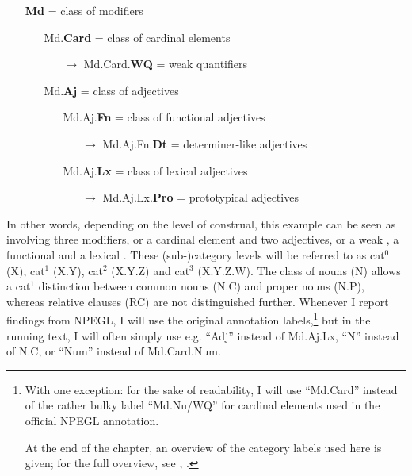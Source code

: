 \documentclass[output=paper,colorlinks,citecolor=brown,draft]{langscibook}
\begin{document}
\begin{enumerate}
    \item[] \textbf{Md} \hfill = class of modifiers
    \begin{enumerate}
        \item[] Md.\textbf{Card}  \hfill  = class of cardinal elements
        \begin{enumerate}
            \item[$\rightarrow$] Md.Card.\textbf{WQ}  \hfill = weak quantifiers
        \end{enumerate}
        \item[] Md.\textbf{Aj}   \hfill = class of adjectives 
        \begin{enumerate}
            \item[] Md.Aj.\textbf{Fn}  \hfill = class of functional adjectives
            \begin{enumerate}
                \item[$\rightarrow$] Md.Aj.Fn.\textbf{Dt}  \hfill = determiner-like adjectives
            \end{enumerate}
            \item[] Md.Aj.\textbf{Lx}  \hfill = class of lexical adjectives
            \begin{enumerate}
                \item[$\rightarrow$] Md.Aj.Lx.\textbf{Pro} \hfill = prototypical  adjectives
            \end{enumerate}
        \end{enumerate}
    \end{enumerate}
\end{enumerate}

In other words, depending on the level of construal, this example can be seen as involving three modifiers, or a cardinal element and two adjectives, or a weak , a functional  and a lexical . These (sub-)category levels will be referred to as cat$^0$ (X), cat$^1$ (X.Y), cat$^2$ (X.Y.Z) and cat$^3$ (X.Y.Z.W). 
The class of nouns (N) allows a cat$^1$ distinction between common nouns (N.C) and proper nouns (N.P), whereas relative clauses (RC) are not distinguished further. 
Whenever I report findings from NPEGL, I will use the original annotation labels,\footnote{With one exception: for the sake of readability, I will use ``Md.Card'' instead of the rather bulky label ``Md.Nu/WQ'' for cardinal elements used in the official NPEGL annotation. 

At the end of the chapter, an overview of the category labels used here is given; for the full overview, see , \citet{Pfaff2019Annot}.} but in the running text, I  will often simply use e.g. ``Adj'' instead of Md.Aj.Lx, ``N'' instead of N.C, or ``Num'' instead of Md.Card.Num. 
\end{document}

